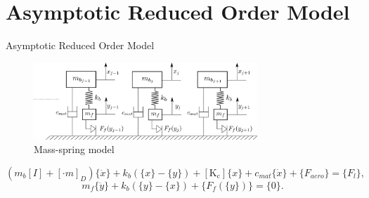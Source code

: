\documentclass[dvipsnames, aspectratio = 169]{beamer}
\begin{document}
\section{Asymptotic Reduced Order Model}

\begin{frame}{Asymptotic Reduced Order Model}
	\begin{figure}[h!]
		\centering
		\includegraphics[width = 0.75\textwidth]{mass_spring_model.png}
		\caption{Mass-spring model}
	\end{figure}
	\begin{equation}\label{eq:gen_xj}
		(m_b [I] + [·m]_D)\{\ddot{x}\} + k_b(\{x\}-\{y\}) + [\mathrm{K_c}]\{x\} + c_{mat}\{\dot{x}\} + \{F_{aero}\} = \{F_l\},
	\end{equation}
	\begin{equation}\label{eq:gen_yj}
		m_f\{\ddot{y}\} + k_b(\{y\} - \{x\}) + \{F_f(\{y\})\} = \{0\}.
	\end{equation}
\end{frame}
\end{document}
